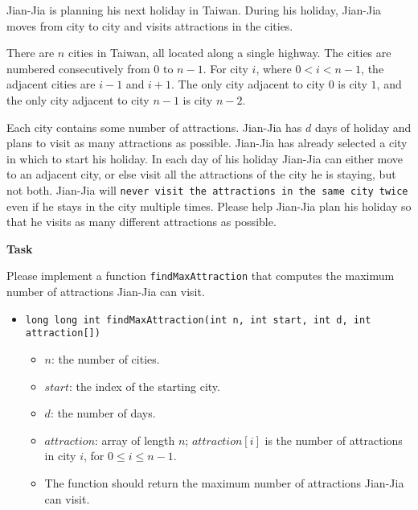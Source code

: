 Jian-Jia is planning his next holiday in Taiwan. During his holiday, Jian-Jia moves from city to city and visits attractions in the cities.

There are $n$ cities in Taiwan, all located along a single highway. The cities are numbered
consecutively from $0$ to $n - 1$. For city $i$, where $0 < i < n - 1$, the adjacent cities are $i - 1$ and $i + 1$. The only city adjacent to city $0$ is city $1$, and the only city adjacent to city $n - 1$ is city $n - 2$.

Each city contains some number of attractions. Jian-Jia has $d$ days of holiday and plans to visit as many attractions as possible. Jian-Jia has already selected a city in which to start his holiday. In each day of his holiday Jian-Jia can either move to an adjacent city, or else visit all the attractions of the city he is staying, but not both. Jian-Jia will \texttt{never visit the attractions in the same city twice} even if he stays in the city multiple times. Please help Jian-Jia plan his holiday so that he visits as many different attractions as possible.

\textbf{Task}

Please implement a function \texttt{findMaxAttraction} that computes the maximum number of attractions Jian-Jia can visit.

\begin{itemize}
\item \texttt{long long int findMaxAttraction(int n, int start, int d,
int attraction[])}
\begin{itemize}
\item $n$: the number of cities.
\item $start$: the index of the starting city.
\item $d$: the number of days.
\item $attraction$: array of length $n$; $attraction[i]$ is the number of attractions in city $i$, for $0 \le i \le n - 1$.
\item The function should return the maximum number of attractions Jian-Jia can visit.
\end{itemize}
\end{itemize}